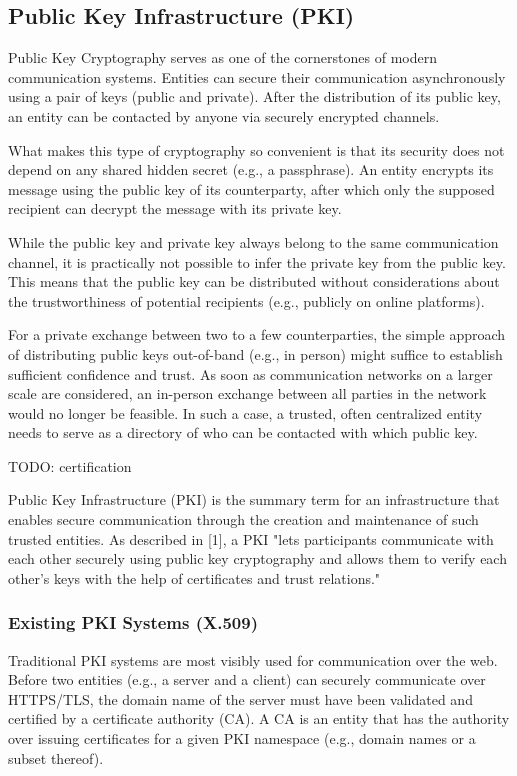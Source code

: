 \subsection{Public Key Infrastructure (PKI)}
\label{subsec:03_pki}

Public Key Cryptography serves as one of the cornerstones of modern communication systems. Entities can secure their communication asynchronously using a pair of keys (public and private). After the distribution of its public key, an entity can be contacted by anyone via securely encrypted channels.

What makes this type of cryptography so convenient is that its security does not depend on any shared hidden secret (e.g., a passphrase). An entity encrypts its message using the public key of its counterparty, after which only the supposed recipient can decrypt the message with its private key.

While the public key and private key always belong to the same communication channel, it is practically not possible to infer the private key from the public key. This means that the public key can be distributed without considerations about the trustworthiness of potential recipients (e.g., publicly on online platforms).

For a private exchange between two to a few counterparties, the simple approach of distributing public keys out-of-band (e.g., in person) might suffice to establish sufficient confidence and trust. As soon as communication networks on a larger scale are considered, an in-person exchange between all parties in the network would no longer be feasible. In such a case, a trusted, often centralized entity needs to serve as a directory of who can be contacted with which public key.

TODO: certification

Public Key Infrastructure (PKI) is the summary term for an infrastructure that enables secure communication through the creation and maintenance of such trusted entities. As described in [1], a PKI "lets participants communicate with each other securely using public key cryptography and allows them to verify each other's keys with the help of certificates and trust relations."


\subsubsection{Existing PKI Systems (X.509)}

Traditional PKI systems are most visibly used for communication over the web. Before two entities (e.g., a server and a client) can securely communicate over HTTPS/TLS, the domain name of the server must have been validated and certified by a certificate authority (CA). A CA is an entity that has the authority over issuing certificates for a given PKI namespace (e.g., domain names or a subset thereof).

